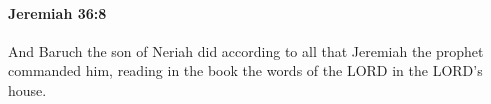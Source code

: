 
		\paragraph{Jeremiah 36:8} %
			\label{JEREMIAH-36-8}

			And Baruch the son of Neriah did according to all that Jeremiah the prophet commanded him, reading in the book the words of the LORD in the LORD’s house.


